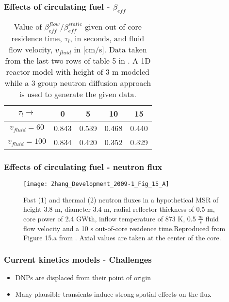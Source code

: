 \documentclass{beamer}
\begin{document}
\begin{frame}
\frametitle{Effects of circulating fuel - $\beta_{eff}$}
\begin{table}[h]
    \caption{Value of $\beta_{eff}^{flow}/\beta_{eff}^{static}$ given out of
        core residence time, $\tau_{l}$, in seconds, 
        and fluid flow velocity, $v_{fluid}$ in [cm/s]. Data taken from
        the last two rows of table 5
        in \cite{mattioda_effective_2000}. A 1D reactor model with height of 3 m
        modeled while a 3 group neutron diffusion approach is used to generate
        the given data.} 
    \label{tbl:mattioda_beta_reduction}
    \begin{center}
        \begin{tabular}{|c|c|c|c|c|}
            \hline
            $\tau_{l}\rightarrow$ & 0 & 5 & 10 & 15 \\
            \hline
            $v_{fluid} = 60$ & 0.843 & 0.539 & 0.468 & 0.440 \\
            \hline
            $v_{fluid} = 100$ & 0.834 & 0.420 & 0.352 & 0.329 \\
            \hline
        \end{tabular}
    \end{center}
\end{table}
\end{frame}

\begin{frame}
\frametitle{Effects of circulating fuel - neutron flux}
    
    \begin{figure}
        \centering
        \texttt{[image: Zhang\_Development\_2009-1\_Fig\_15\_A]}
        \caption{Fast (1) and thermal (2) neutron fluxes in a hypothetical MSR of height 3.8 m, diameter 3.4 m,
    radial reflector thickness of 0.5 m, core power of 2.4 GWth, inflow temperature of 873 K,
    0.5 $\frac{m}{s}$ fluid flow
    velocity and a 10 s out-of-core residence time.Reproduced from Figure 15.a from
            \cite{zhang_development_2009-1}. 
               Axial
               values are taken at the center of the core.}
        \label{fig:zhang_development_flux}
    \end{figure}

\end{frame}

\begin{frame}
\frametitle{Current kinetics models - Challenges}

    \begin{itemize}
        \item DNPs are displaced from their point of origin
        \item Many plausible transients induce strong spatial effects on the
                flux
    \end{itemize}

\end{frame}
\end{document}
